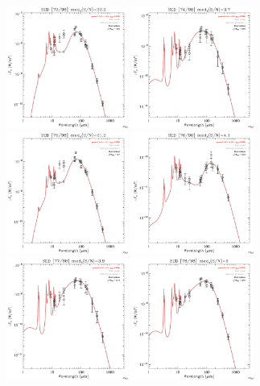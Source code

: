 \documentclass[preprint2,longabstract]{aastex}
\begin{document}
\begin{figure}
    \includegraphics[trim=0 2mm 0 0, clip, width=40mm]{SEDs/sed_73.pdf}
	\includegraphics[trim=0 2mm 0 0, clip, width=40mm]{SEDs/sed_74.pdf}
	\includegraphics[trim=0 2mm 0 0, clip, width=40mm]{SEDs/sed_75.pdf}
	\includegraphics[trim=0 2mm 0 0, clip, width=40mm]{SEDs/sed_76.pdf}
	\includegraphics[trim=0 2mm 0 0, clip, width=40mm]{SEDs/sed_77.pdf}
	\includegraphics[trim=0 2mm 0 0, clip, width=40mm]{SEDs/sed_78.pdf}

\end{figure}
\end{document}
